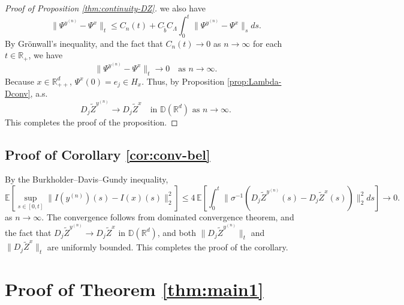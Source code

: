 \documentclass[11pt]{article}
\theoremstyle{definition}
\theoremstyle{plain}
\newcommand{\R}{\mathbb{R}}
\newcommand{\tb}{\tilde{b}}
\begin{document}
\begin{appendices}
\begin{proof}[Proof of Proposition \ref{thm:continuity-DZ}]
  we also have
  \[
  \| \Psi^{y^{(n)}} - \Psi^x \|_t \leq C_n(t) + C_{\tb} C_\Lambda \int_0^t \|\Psi^{y^{(n)}} - \Psi^{x}\|_s ds.
  \]
  By Grönwall's inequality, and the fact that \( C_n(t) \to 0 \) as \( n \to \infty \) for each $t \in \mathbb{R}_+$, we have
  \[
  \| \Psi^{y^{(n)}} - \Psi^x \|_t  \to 0 \quad \text{as } n \to \infty.
  \]
  Because $x \in \R_{++}^d$, $\Psi^x(0) = e_j \in H_x$. Thus, by Proposition \ref{prop:Lambda-Dconv}, a.s.
  \[
  D_j\tilde{Z}^{y^{(n)}} \to D_j\tilde{Z}^x \quad \text{in } \mathbb{D}(\mathbb{R}^d) \text{ as } n \to \infty.
  \]
  This completes the proof of the proposition. 
  \end{proof}

\subsection{Proof of Corollary \ref{cor:conv-bel}} 
  By the Burkholder–Davis–Gundy inequality,
  \[
  \mathbb{E} \left[ \sup_{s\in [0, t]} \|I(y^{(n)})(s) - I(x)(s)\|_2^2 \right] \leq 4 \, \mathbb{E} \left[ \int_0^t 
  \|\sigma^{-1}(D_j\tilde{Z}^{y^{(n)}}(s) - D_j\tilde{Z}^x(s))\|_2^2 ds \right] \to 0.
  \]
  as \( n \to \infty \). The convergence follows from dominated convergence theorem, and the fact that \( D_j\tilde{Z}^{y^{(n)}} \to D_j\tilde{Z}^x \) in \( \mathbb{D}(\mathbb{R}^d) \), 
  and both $\|D_j\tilde{Z}^{y^{(n)}}\|_t$ and $\|D_j\tilde{Z}^{x}\|_t$ are uniformly bounded. 
  This completes the proof of the corollary.

  \section{Proof of Theorem \ref{thm:main1}}\label{sec:proof-main1}
  

\end{appendices}
\end{document}
